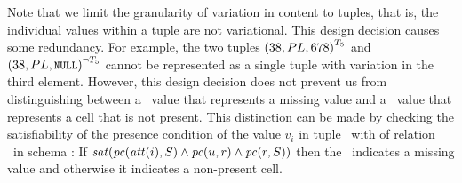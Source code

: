 Note that we limit the granularity of variation in content to tuples, that is,
the individual values within a tuple are not variational.
%
This design decision causes some redundancy.
For example, the two tuples
\ensuremath{\annot [\tFive] {(38, PL, 678)}} and 
\ensuremath{\annot [\neg \tFive] {(38, PL, \nul)}}
cannot be represented as a single tuple
with variation in the third element. However, this design decision
does not prevent us from distinguishing between a \nul\ value
that represents a missing value and a \nul\ value that represents
a cell that is not present. 
This distinction can be made by checking
the satisfiability of 
the presence condition of the value $v_i$ in tuple \vTuple\ with of relation \vRel\ in schema \vSch:
If $\sat{\getPCfrom {\getAtt i} \vSch \wedge \getPCfrom \vTuple \vRel \wedge \getPCfrom \vRel \vSch}$ 
then the \nul\ indicates a missing value
and otherwise it indicates a non-present cell.
%


